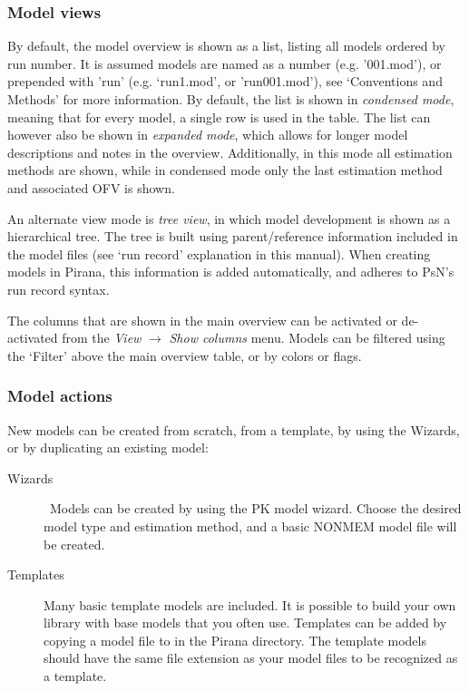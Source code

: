 {\subsubsection*{Model views}
By default, the model overview is shown as a list, listing all models
ordered by run number. It is assumed models are named as a number
(e.g. '001.mod'), or prepended with 'run' (e.g. `run1.mod', or 'run001.mod'), see
`Conventions and Methods' for more information. By default, the list is shown in \textit{condensed mode},
meaning that for every model, a single row is used in the table. The
list can however also be shown in \textit{expanded mode}, which allows
for longer model descriptions and notes in the overview. Additionally,
in this mode all estimation methods are shown, while in condensed mode
only the last estimation method and associated OFV is shown.

An alternate view mode is \textit{tree view}, in which model development is
shown as a hierarchical tree. The tree is built using parent/reference
information included in the model files (see `run record' explanation in this manual). When creating models in Pirana, this information is added automatically, and adheres to PsN's run record syntax. 

The columns that are shown in the main overview can be activated or de-activated from the \textit{View} $\rightarrow$ 
\textit{Show columns} menu. Models can be filtered using the `Filter' above the
main overview table, or by colors or flags.

\subsubsection*{Model actions}
\noindent New models can be created from scratch, from a template, by
using the Wizards, or by duplicating an existing model:

\begin{description}
\item[Wizards]\ Models can be created by using the PK model
wizard. Choose the desired model type and estimation method, and a
basic NONMEM model file will be created.

\item[Templates] Many basic template models are included. It is
possible to build your own library with base models that you often
use. Templates can be added by copying a model file to
\normalfont in the Pirana directory. The
template models should have the same file extension as your model
files to be recognized as a template.


\end{description}}
